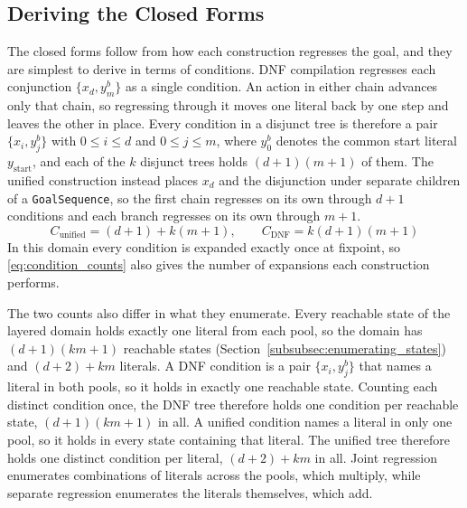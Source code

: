     \subsection{Deriving the Closed Forms}
    \label{subsec:compactness_closed_forms}
    The closed forms follow from how each construction regresses the goal, and they are simplest to derive in terms of conditions.
    DNF compilation regresses each conjunction $\{x_d, y^b_m\}$ as a single condition.
    An action in either chain advances only that chain, so regressing through it moves one literal back by one step and leaves the other in place.
    Every condition in a disjunct tree is therefore a pair $\{x_i, y^b_j\}$ with $0 \le i \le d$ and $0 \le j \le m$, where $y^b_0$ denotes the common start literal $y_{\text{start}}$, and each of the $k$ disjunct trees holds $(d+1)(m+1)$ of them.
    The unified construction instead places $x_d$ and the disjunction under separate children of a \texttt{GoalSequence}, so the first chain regresses on its own through $d+1$ conditions and each branch regresses on its own through $m+1$.
    \begin{equation}
        C_{\text{unified}} = (d+1) + k(m+1), \qquad
        C_{\text{DNF}} = k(d+1)(m+1)
        \label{eq:condition_counts}
    \end{equation}
    In this domain every condition is expanded exactly once at fixpoint, so \eqref{eq:condition_counts} also gives the number of expansions each construction performs.

    The two counts also differ in what they enumerate.
    Every reachable state of the layered domain holds exactly one literal from each pool, so the domain has $(d+1)(km+1)$ reachable states (Section~\ref{subsubsec:enumerating_states}) and $(d+2) + km$ literals.
    A DNF condition is a pair $\{x_i, y^b_j\}$ that names a literal in both pools, so it holds in exactly one reachable state.
    Counting each distinct condition once, the DNF tree therefore holds one condition per reachable state, $(d+1)(km+1)$ in all.
    A unified condition names a literal in only one pool, so it holds in every state containing that literal.
    The unified tree therefore holds one distinct condition per literal, $(d+2) + km$ in all.
    Joint regression enumerates combinations of literals across the pools, which multiply, while separate regression enumerates the literals themselves, which add.

